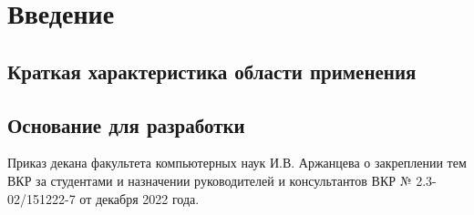 \section{Введение}


\subsection{Краткая характеристика области применения}




\subsection{Основание для разработки}
Приказ декана факультета компьютерных наук И.В. Аржанцева о закреплении тем ВКР за студентами и назначении руководителей и консультантов ВКР № 2.3-02/151222-7 от декабря 2022 года.

